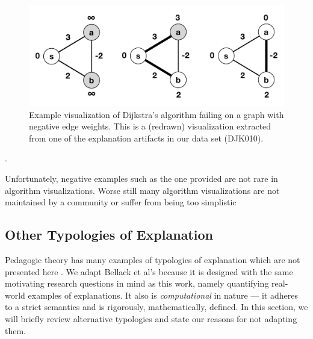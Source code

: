 \documentclass[conference]{IEEEtran}
\begin{document}
\begin{figure}
\centering
\includegraphics[width=0.9\columnwidth]{VisDJK010-Clean}
\caption{Example visualization of Dijkstra's algorithm failing on a graph with
negative edge weights. This is a (redrawn) visualization extracted from one of
the explanation artifacts in our data set (DJK010).}
\label{fig:negative-dijkstra}
\end{figure}


%
\cite{HDS02}.

Unfortunately, negative examples such as the one provided are not rare in
algorithm visualizations. Worse still many algorithm visualizations are not
maintained by a community or suffer from being too
simplistic\cite{shaffer2010algorithm} 

\subsection{Other Typologies of Explanation}
\label{sec:rw:typ}

Pedagogic theory has many examples of typologies of explanation which are not
presented here \cite{Smith1970-SMIASO-13, smith1967language, hyman1968teaching, swift1961explanation} . We adapt Bellack et al's because it is designed with the same
motivating research questions in mind as this work, namely quantifying
real-world examples of explanations. It also is \emph{computational} in nature
--- it adheres to a strict semantics and is rigorously, mathematically, defined.
In this section, we will briefly review alternative typologies and state our
reasons for not adapting them.
\end{document}
